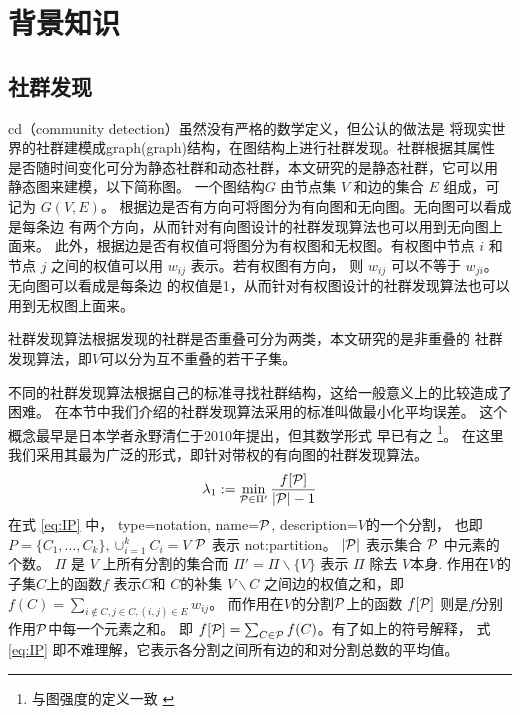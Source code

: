 
\chapter{背景知识}

\section{社群发现}\label{sec:community_detection}

\gls{cd}（community detection）虽然没有严格的数学定义，但公认的做法是
将现实世界的社群建模成\gls{graph}(graph)结构，在图结构上进行社群发现。社群根据其属性
是否随时间变化可分为静态社群和动态社群，本文研究的是静态社群，它可以用
静态图来建模，以下简称图。
一个图结构$G$ 由节点集 $V$ 和边的集合 $E$ 组成，可记为 $G(V,E)$。
根据边是否有方向可将图分为有向图和无向图。无向图可以看成是每条边
有两个方向，从而针对有向图设计的社群发现算法也可以用到无向图上面来。
此外，根据边是否有权值可将图分为有权图和无权图。有权图中节点 $i$
和节点 $j$ 之间的权值可以用 $w_{ij}$ 表示。若有权图有方向，
则 $w_{ij}$ 可以不等于 $w_{ji}$。
无向图可以看成是每条边
的权值是1，从而针对有权图设计的社群发现算法也可以用到无权图上面来。

社群发现算法根据发现的社群是否重叠可分为两类，本文研究的是非重叠的
社群发现算法，即$V$可以分为互不重叠的若干子集。

不同的社群发现算法根据自己的标准寻找社群结构，这给一般意义上的比较造成了困难。
在本节中我们介绍的社群发现算法采用的标准叫做最小化平均误差。
这个概念最早是日本学者永野清仁于2010年提出\cite{mac}，但其数学形式
早已有之
\footnote{与图强度的定义一致 \cite{cunningham1985optimal}}。
在这里我们采用其最为广泛的形式，即针对带权的有向图的社群发现算法。
\begin{equation}\label{eq:IP}
  \lambda_1 := \min_{\P \in \Pi'}\frac{ f[\P] }{  \abs{\P} - 1 } 
\end{equation}
在式 \eqref{eq:IP} 中，
{
  type=notation,
  name={$\P$},
  description={$V$的一个分割，
  也即  $P=\{C_1, \dots, C_k\},
  \cup_{i=1}^k C_i=V$}
}
$\P$ 表示 \glsdesc{not:partition}。
$\abs{\mathcal{P}}$ 表示集合 $\P$ 中元素的个数。
$\Pi$ 是 $V$ 上所有分割的集合而 $\Pi'=\Pi\backslash\{V\}$ 表示 $\Pi$
除去 $V$本身.
作用在$V$的子集$C$上的函数$f$
表示$C$和 $C$的补集 $V\backslash C$ 之间边的权值之和，即
$f(C)=\sum_{i \not\in C, j\in C, (i,j) \in E} w_{ij}$。
而作用在$V$的分割$\P$上的函数 $f[\P]$ 则是$f$分别作用$\P$中每一个元素之和。
即 $f[\P]=\sum_{C \in \P} f(C)$。有了如上的符号解释，
式 \eqref{eq:IP} 即不难理解，它表示各分割之间所有边的和对分割总数的平均值。

